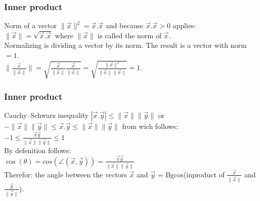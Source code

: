 \begin{frame}
	\frametitle{Inner product}
	\begin{block}{Norm of a vector}
		$\|\overrightarrow{x}\|^2=\overrightarrow{x}.\overrightarrow{x}$ and because $\overrightarrow{x}.\overrightarrow{x}>0$ applies:\\
		$\|\overrightarrow{x}\|=\sqrt{\overrightarrow{x}.\overrightarrow{x}}$ where $\|\overrightarrow{x}\|$ is called the norm of $\overrightarrow{x}$.\\
		Normalizing is dividing a vector by its norm. The result is a vector with norm $=1$.\\
		$\|\frac{\overrightarrow{x}}{\|\overrightarrow{x}\|}\|= \sqrt{\frac{\overrightarrow{x}}{\|\overrightarrow{x}\|} \frac{\overrightarrow{x}}{\|\overrightarrow{x}\|}}= \sqrt{\frac{\|\overrightarrow{x}\|^2}{\|\overrightarrow{x}\|\|\overrightarrow{x}\|}}=1$.
	\end{block} 
\end{frame}

\begin{frame}
	\frametitle{Inner product}
	\begin{block}{Cauchy–Schwarz inequality}
		$|\overrightarrow{x}.\overrightarrow{y}|\leq \|\overrightarrow{x}\|\|\overrightarrow{y}\|$ or \\
		$-\|\overrightarrow{x}\|\|\overrightarrow{y}\|\leq \overrightarrow{x}.\overrightarrow{y}\leq \|\overrightarrow{x}\|\|\overrightarrow{y}\|$ from wich follows:\\
		$-1 \leq\frac{\overrightarrow{x}\overrightarrow{y}} {\|\overrightarrow{x}\|\|\overrightarrow{y}\|} \leq 1$\\
		By defenition follows:\\
		$\cos(\theta)=cos(\angle (\overrightarrow{x}, \overrightarrow{y}))= \frac{\overrightarrow{x}\overrightarrow{y}} {\|\overrightarrow{x}\|\|\overrightarrow{y}\|}$\\
		Therefor: the angle between the vectors $\overrightarrow{x}$ and $\overrightarrow{y}$ = Bgcos(inproduct of $\frac{\overrightarrow{x}}{\|\overrightarrow{x}\|}$ and $\frac{\overrightarrow{y}}{\|\overrightarrow{y}\|}$).
	\end{block} 
\end{frame}

